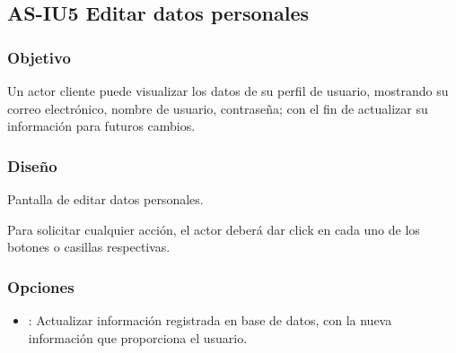 %

\subsection{AS-IU5 Editar datos personales}

\subsubsection{Objetivo}
	Un actor cliente puede visualizar los datos de su perfil de usuario, 
mostrando su correo electrónico, nombre de usuario, contraseña; con el fin de 
actualizar su información para futuros cambios.

\subsubsection{Diseño}

{Pantalla de editar datos personales.} 

	Para solicitar cualquier acción, el actor deberá dar click en cada uno 
de los botones o casillas respectivas.

\subsubsection{Opciones}
\begin{itemize}
	\item {}: Actualizar información registrada en 
	base de datos, con la nueva información que proporciona el usuario.
\end{itemize}
